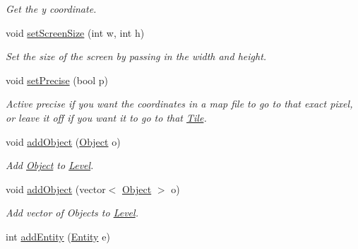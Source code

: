 \begin{DoxyCompactItemize}
\begin{DoxyCompactList}\small\item\em Get the y coordinate. \end{DoxyCompactList}\item 
void \hyperlink{classLevel_a22a202624bb540acc74b678b74b60c9d}{set\+Screen\+Size} (int w, int h)\hypertarget{classLevel_a22a202624bb540acc74b678b74b60c9d}{}\label{classLevel_a22a202624bb540acc74b678b74b60c9d}

\begin{DoxyCompactList}\small\item\em Set the size of the screen by passing in the width and height. \end{DoxyCompactList}\item 
void \hyperlink{classLevel_a6f522671fde4a9d25945a9df651f6e28}{set\+Precise} (bool p)\hypertarget{classLevel_a6f522671fde4a9d25945a9df651f6e28}{}\label{classLevel_a6f522671fde4a9d25945a9df651f6e28}

\begin{DoxyCompactList}\small\item\em Active precise if you want the coordinates in a map file to go to that exact pixel, or leave it off if you want it to go to that \hyperlink{classTile}{Tile}. \end{DoxyCompactList}\item 
void \hyperlink{classLevel_a85e4149562c645b6ee11e7a0338dc6d6}{add\+Object} (\hyperlink{classObject}{Object} o)\hypertarget{classLevel_a85e4149562c645b6ee11e7a0338dc6d6}{}\label{classLevel_a85e4149562c645b6ee11e7a0338dc6d6}

\begin{DoxyCompactList}\small\item\em Add \hyperlink{classObject}{Object} to \hyperlink{classLevel}{Level}. \end{DoxyCompactList}\item 
void \hyperlink{classLevel_a227e7b01aecb4cfd14cd54233788dee2}{add\+Object} (vector$<$ \hyperlink{classObject}{Object} $>$ o)\hypertarget{classLevel_a227e7b01aecb4cfd14cd54233788dee2}{}\label{classLevel_a227e7b01aecb4cfd14cd54233788dee2}

\begin{DoxyCompactList}\small\item\em Add vector of Objects to \hyperlink{classLevel}{Level}. \end{DoxyCompactList}\item 
int \hyperlink{classLevel_a9345e51c6abbc422864bf6954c5f6312}{add\+Entity} (\hyperlink{classEntity}{Entity} e)\hypertarget{classLevel_a9345e51c6abbc422864bf6954c5f6312}{}\label{classLevel_a9345e51c6abbc422864bf6954c5f6312}


\end{DoxyCompactItemize}
